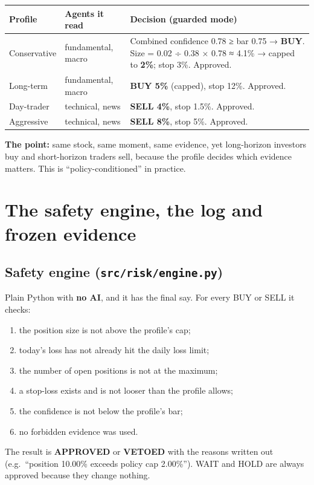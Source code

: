 \documentclass[10.5pt,a4paper]{article}
\newcommand{\file}[1]{\texttt{#1}}
\begin{document}
\begin{tabularx}{\linewidth}{L{2.0cm}L{3.0cm}Y}
\toprule
\textbf{Profile} & \textbf{Agents it read} & \textbf{Decision (guarded mode)} \\
\midrule
Conservative & fundamental, macro & Combined confidence 0.78 ≥ bar 0.75 → \textbf{BUY}. Size = 0.02 ÷ 0.38 × 0.78 ≈ 4.1\% → capped to \textbf{2\%}; stop 3\%. Approved. \\
Long-term & fundamental, macro & \textbf{BUY 5\%} (capped), stop 12\%. Approved. \\
Day-trader & technical, news & \textbf{SELL 4\%}, stop 1.5\%. Approved. \\
Aggressive & technical, news & \textbf{SELL 8\%}, stop 5\%. Approved. \\
\bottomrule
\end{tabularx}

\textbf{The point:} same stock, same moment, same evidence, yet long-horizon investors buy and short-horizon traders sell, because the profile decides which evidence matters. This is ``policy-conditioned'' in practice.

\section{The safety engine, the log and frozen evidence}

\subsection{Safety engine (\file{src/risk/engine.py})}
Plain Python with \textbf{no AI}, and it has the final say. For every BUY or SELL it checks:
\begin{enumerate}
\item the position size is not above the profile's cap;
\item today's loss has not already hit the daily loss limit;
\item the number of open positions is not at the maximum;
\item a stop-loss exists and is not looser than the profile allows;
\item the confidence is not below the profile's bar;
\item no forbidden evidence was used.
\end{enumerate}
The result is \textbf{APPROVED} or \textbf{VETOED} with the reasons written out (e.g.\ ``position 10.00\% exceeds policy cap 2.00\%''). WAIT and HOLD are always approved because they change nothing.
\end{document}
